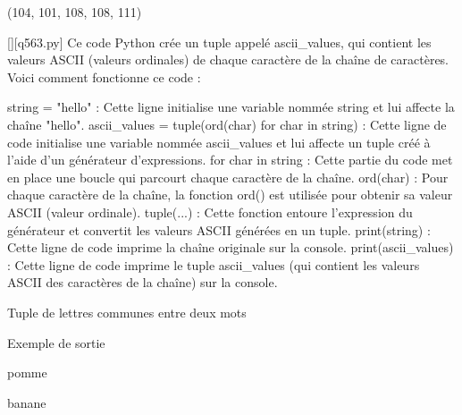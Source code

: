 (104, 101, 108, 108, 111)
        \par
        \begin{solution}
            \renewcommand{\nomfichier}{q563.py}
            \pythonfile{\chemincode \nomfichier}[][\nomfichier]
            Ce code Python crée un tuple appelé ascii\_values, qui contient les valeurs ASCII (valeurs ordinales) de chaque caractère de la chaîne de caractères. Voici comment fonctionne ce code :

    string = "hello" : Cette ligne initialise une variable nommée string et lui affecte la chaîne "hello".
    ascii\_values = tuple(ord(char) for char in string) : Cette ligne de code initialise une variable nommée ascii\_values et lui affecte un tuple créé à l'aide d'un générateur d'expressions.
        for char in string : Cette partie du code met en place une boucle qui parcourt chaque caractère de la chaîne.
        ord(char) : Pour chaque caractère de la chaîne, la fonction ord() est utilisée pour obtenir sa valeur ASCII (valeur ordinale).
        tuple(...) : Cette fonction entoure l'expression du générateur et convertit les valeurs ASCII générées en un tuple.
    print(string) : Cette ligne de code imprime la chaîne originale sur la console.
    print(ascii\_values) : Cette ligne de code imprime le tuple ascii\_values (qui contient les valeurs ASCII des caractères de la chaîne) sur la console.
        \end{solution}
        

        \question
        Tuple de lettres communes entre deux mots

Exemple de sortie

pomme

banane

